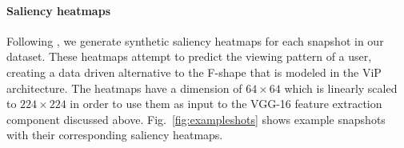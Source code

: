 \paragraph{Saliency heatmaps}
Following \cite{shan2017two}, we generate synthetic saliency heatmaps for each snapshot in our data\-set. 
These heatmaps attempt to predict the viewing pattern of a user, creating a data driven alternative to the F-shape that is modeled in the ViP architecture. 
The heatmaps have a dimension of $64\times64$ which is linearly scaled to $224\times224$ in order to use them as input to the VGG-16 feature extraction component discussed above.
Fig.~\ref{fig:exampleshots} shows example snapshots with their corresponding saliency heatmaps.
